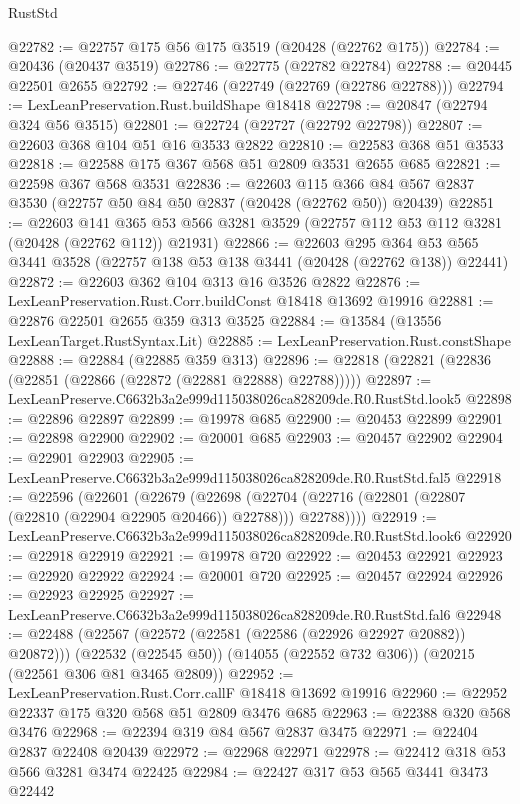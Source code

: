 \begin{lexlean}{RustStd}
\begin{coremodule}
@22782 := @22757 @175 @56 @175 @3519 (@20428 (@22762 @175))
@22784 := @20436 (@20437 @3519)
@22786 := @22775 (@22782 @22784)
@22788 := @20445 @22501 @2655
@22792 := @22746 (@22749 (@22769 (@22786 @22788)))
@22794 := LexLeanPreservation.Rust.buildShape @18418
@22798 := @20847 (@22794 @324 @56 @3515)
@22801 := @22724 (@22727 (@22792 @22798))
@22807 := @22603 @368 @104 @51 @16 @3533 @2822
@22810 := @22583 @368 @51 @3533
@22818 := @22588 @175 @367 @568 @51 @2809 @3531 @2655 @685
@22821 := @22598 @367 @568 @3531
@22836 := @22603
    @115
    @366
    @84
    @567
    @2837
    @3530
    (@22757 @50 @84 @50 @2837 (@20428 (@22762 @50)) @20439)
@22851 := @22603
    @141
    @365
    @53
    @566
    @3281
    @3529
    (@22757 @112 @53 @112 @3281 (@20428 (@22762 @112)) @21931)
@22866 := @22603
    @295
    @364
    @53
    @565
    @3441
    @3528
    (@22757 @138 @53 @138 @3441 (@20428 (@22762 @138)) @22441)
@22872 := @22603 @362 @104 @313 @16 @3526 @2822
@22876 := LexLeanPreservation.Rust.Corr.buildConst @18418 @13692 @19916
@22881 := @22876 @22501 @2655 @359 @313 @3525
@22884 := @13584 (@13556 LexLeanTarget.RustSyntax.Lit)
@22885 := LexLeanPreservation.Rust.constShape
@22888 := @22884 (@22885 @359 @313)
@22896 := @22818 (@22821 (@22836 (@22851 (@22866 (@22872 (@22881 @22888) @22788)))))
@22897 := LexLeanPreserve.C6632b3a2e999d115038026ca828209de.R0.RustStd.look5
@22898 := @22896 @22897
@22899 := @19978 @685
@22900 := @20453 @22899
@22901 := @22898 @22900
@22902 := @20001 @685
@22903 := @20457 @22902
@22904 := @22901 @22903
@22905 := LexLeanPreserve.C6632b3a2e999d115038026ca828209de.R0.RustStd.fal5
@22918 := @22596
    (@22601
      (@22679
        (@22698 (@22704 (@22716 (@22801 (@22807 (@22810 (@22904 @22905 @20466)) @22788))) @22788))))
@22919 := LexLeanPreserve.C6632b3a2e999d115038026ca828209de.R0.RustStd.look6
@22920 := @22918 @22919
@22921 := @19978 @720
@22922 := @20453 @22921
@22923 := @22920 @22922
@22924 := @20001 @720
@22925 := @20457 @22924
@22926 := @22923 @22925
@22927 := LexLeanPreserve.C6632b3a2e999d115038026ca828209de.R0.RustStd.fal6
@22948 := @22488
    (@22567 (@22572 (@22581 (@22586 (@22926 @22927 @20882)) @20872)))
    (@22532 (@22545 @50))
    (@14055 (@22552 @732 @306))
    (@20215 (@22561 @306 @81 @3465 @2809))
@22952 := LexLeanPreservation.Rust.Corr.callF @18418 @13692 @19916
@22960 := @22952 @22337 @175 @320 @568 @51 @2809 @3476 @685
@22963 := @22388 @320 @568 @3476
@22968 := @22394 @319 @84 @567 @2837 @3475
@22971 := @22404 @2837 @22408 @20439
@22972 := @22968 @22971
@22978 := @22412 @318 @53 @566 @3281 @3474 @22425
@22984 := @22427 @317 @53 @565 @3441 @3473 @22442

\end{coremodule}
\end{lexlean}
